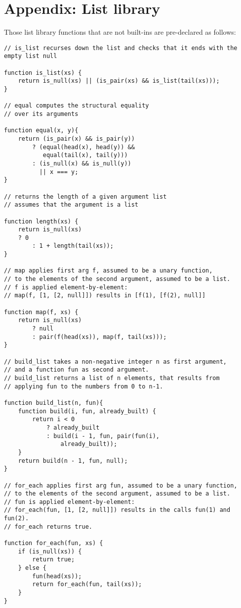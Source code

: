 \section*{Appendix: List library}

Those list library functions that are not built-ins are pre-declared as follows:

\begin{lstlisting}
// is_list recurses down the list and checks that it ends with the empty list null

function is_list(xs) {
    return is_null(xs) || (is_pair(xs) && is_list(tail(xs)));
}

// equal computes the structural equality 
// over its arguments

function equal(x, y){
    return (is_pair(x) && is_pair(y)) 
        ? (equal(head(x), head(y)) &&
           equal(tail(x), tail(y)))
        : (is_null(x) && is_null(y))
          || x === y;
}

// returns the length of a given argument list
// assumes that the argument is a list

function length(xs) {
    return is_null(xs) 
	? 0
        : 1 + length(tail(xs));
}

// map applies first arg f, assumed to be a unary function,
// to the elements of the second argument, assumed to be a list.
// f is applied element-by-element: 
// map(f, [1, [2, null]]) results in [f(1), [f(2), null]]

function map(f, xs) {
    return is_null(xs)
        ? null
        : pair(f(head(xs)), map(f, tail(xs)));
}

// build_list takes a non-negative integer n as first argument,
// and a function fun as second argument.
// build_list returns a list of n elements, that results from 
// applying fun to the numbers from 0 to n-1.

function build_list(n, fun){
    function build(i, fun, already_built) {
        return i < 0
            ? already_built
            : build(i - 1, fun, pair(fun(i),
                already_built));
    }
    return build(n - 1, fun, null);
}

// for_each applies first arg fun, assumed to be a unary function,
// to the elements of the second argument, assumed to be a list.
// fun is applied element-by-element:
// for_each(fun, [1, [2, null]]) results in the calls fun(1) and fun(2).
// for_each returns true.

function for_each(fun, xs) {
    if (is_null(xs)) {
        return true;
    } else {
        fun(head(xs));
        return for_each(fun, tail(xs));
    }
}


\end{lstlisting}

